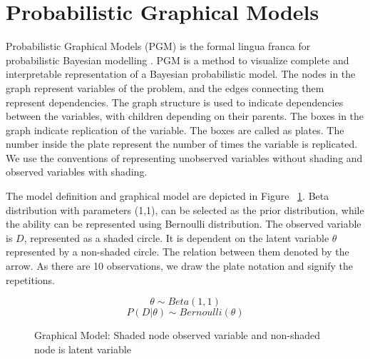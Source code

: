 \section{Probabilistic Graphical Models}

Probabilistic Graphical Models  (PGM) is the formal lingua franca for probabilistic Bayesian modelling \cite{Tenenbaum2008PP}. PGM is a method to visualize complete and interpretable representation of a Bayesian probabilistic model. The nodes in the graph represent variables of the problem, and the edges connecting them represent dependencies. The graph structure is used to indicate dependencies between the variables, with children depending on their parents. 
The boxes in the graph indicate replication of the variable. The boxes are called as plates. The number inside the plate represent the number of times the variable is replicated. We use the conventions of representing unobserved variables without shading and observed variables with shading.

The model definition and graphical model are depicted in Figure ~\ref{fig:pgm}. Beta distribution with parameters  (1,1), can be selected as the prior distribution, while the ability can be represented using Bernoulli distribution. 
 The observed variable is $D$, represented as a shaded circle. It is dependent on the latent variable $\theta$ represented by a non-shaded circle. The relation between them denoted by the arrow. As there are 10 observations, we draw the plate notation and signify the repetitions.

\noindent
\begin{figure}[htp]

\begin{minipage}{0.3\textwidth}
\centering
{}
\end{minipage}%
\begin{minipage}{0.7\textwidth}
\begin{equation*}
	\theta \sim Beta (1,1) 
\end{equation*}
\begin{equation*}
	P (D|\theta) \sim Bernoulli (\theta)
\end{equation*}
\end{minipage}
\caption[Graphical Model]{Graphical Model: Shaded node observed variable and non-shaded node is latent variable}
\label{fig:pgm}
\end{figure}

